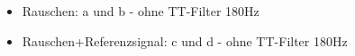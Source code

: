 \documentclass{scrartcl}						%
\begin{document}
			\begin{itemize}
			\item Rauschen: a und b - ohne TT-Filter 180Hz
			\begin{figure}[h!]
			\end{figure}
			\item Rauschen+Referenzsignal: c und d - ohne TT-Filter 180Hz
				\begin{figure}[h!]

\end{figure}
\end{itemize}
\end{document}
